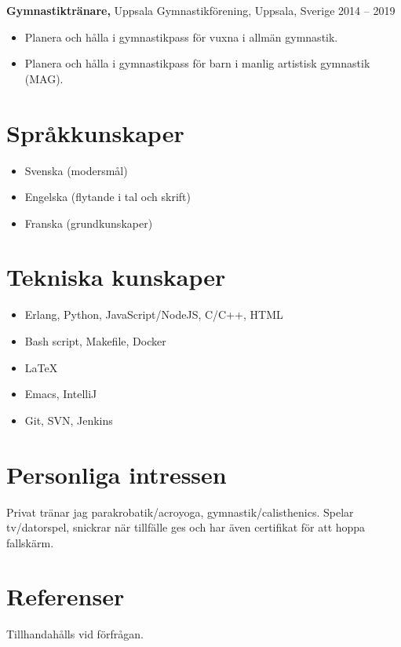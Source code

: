 \documentclass[margin]{res}
\begin{document}
\begin{resume}
{\bf Gymnastiktränare,} Uppsala Gymnastikförening, Uppsala, Sverige \hfill 2014 -- 2019
\begin{itemize} \itemsep -2pt
\item Planera och hålla i gymnastikpass för vuxna i allmän gymnastik.
\item Planera och hålla i gymnastikpass för barn i manlig artistisk gymnastik (MAG).
\end{itemize}

\section{Språkkunskaper}
\begin{itemize} \itemsep -2pt
\item Svenska (modersmål)
\item Engelska (flytande i tal och skrift)
\item Franska (grundkunskaper)
\end{itemize}

\section{Tekniska kunskaper}
\begin{itemize} \itemsep -2pt
\item Erlang, Python, JavaScript/NodeJS, C/C++, HTML
\item Bash script, Makefile, Docker
\item LaTeX
\item Emacs, IntelliJ
\item Git, SVN, Jenkins
\end{itemize}

\section{Personliga intressen}
Privat tränar jag parakrobatik/acroyoga, gymnastik/calisthenics.
Spelar tv/datorspel, snickrar när tillfälle ges och har även certifikat för att hoppa fallskärm.

\section{Referenser}
Tillhandahålls vid förfrågan.

\end{resume}
\end{document}
